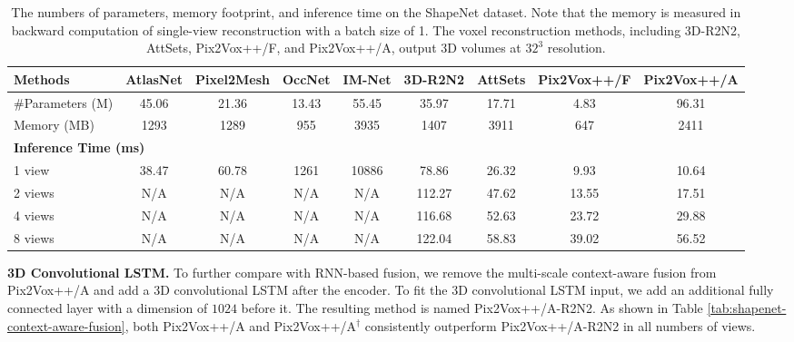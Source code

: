 \documentclass[twocolumn]{svjour3}
\begin{document}
\begin{table*}
  \caption{The numbers of parameters, memory footprint, and inference time on the ShapeNet dataset. Note that the memory is measured in backward computation of single-view reconstruction with a batch size of 1. The voxel reconstruction methods, including 3D-R2N2, AttSets, Pix2Vox++/F, and Pix2Vox++/A, output 3D volumes at $32^3$ resolution.}
  \centering
  \begin{tabularx}{\linewidth}{l|cccc|cccc}
  \toprule
  Methods               & AtlasNet    & Pixel2Mesh
                        & OccNet      & IM-Net
                        & 3D-R2N2     & AttSets
                        & Pix2Vox++/F & Pix2Vox++/A \\
  \midrule
  \#Parameters (M)      & 45.06       & 21.36
                        & 13.43       & 55.45
                        & 35.97       & 17.71
                        & 4.83        & 96.31 \\
  Memory (MB)           & 1293        & 1289
                        & 955         & 3935
                        & 1407        & 3911
                        & 647         & 2411 \\
  \midrule
  \midrule
  \multicolumn{8}{l}{\bf{Inference Time (ms)}} \\
  \midrule
  1 view                & 38.47       & 60.78
                        & 1261        & 10886
                        & 78.86       & 26.32
                        & 9.93        & 10.64 \\
  2 views               & N/A         & N/A
                        & N/A         & N/A
                        & 112.27      & 47.62 
                        & 13.55       & 17.51 \\
  4 views               & N/A         & N/A
                        & N/A         & N/A
                        & 116.68      & 52.63
                        & 23.72       & 29.88 \\
  8 views               & N/A         & N/A
                        & N/A         & N/A
                        & 122.04      & 58.83
                        & 39.02       & 56.52 \\
  \bottomrule
  \end{tabularx}
  \label{tab:space-time-complexity}
\end{table*}

\noindent \textbf{3D Convolutional LSTM.}
To further compare with RNN-based fusion, we remove the multi-scale context-aware fusion from Pix2Vox++/A and add a 3D convolutional LSTM \citep{DBLP:conf/eccv/ChoyXGCS16} after the encoder.
To fit the 3D convolutional LSTM input, we add an additional fully connected layer with a dimension of $1024$ before it.
The resulting method is named Pix2Vox++/A-R2N2.
As shown in Table \ref{tab:shapenet-context-aware-fusion}, both Pix2Vox++/A and Pix2Vox++/A$^\dag$ consistently outperform Pix2Vox++/A-R2N2 in all numbers of views. 
\end{document}
